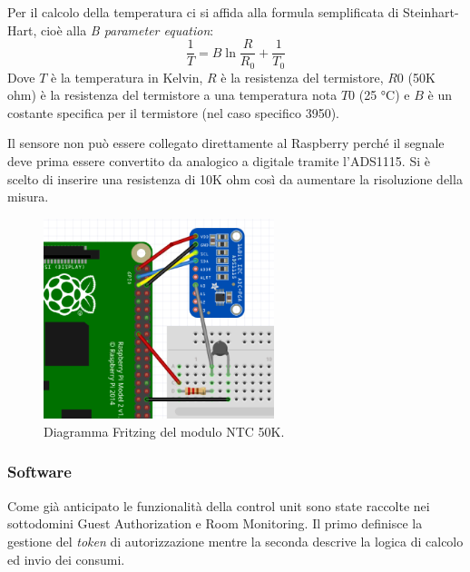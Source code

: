 Per il calcolo della temperatura ci si affida alla formula semplificata di Steinhart-Hart, cioè alla \textit{B parameter equation}:
%
\[\frac{1}{T} = B \ln{\frac{R}{R_0}} + \frac{1}{T_0}\]
%
Dove $T$ è la temperatura in Kelvin, $R$ è la resistenza del termistore, $R0$ (50K ohm) è la resistenza del termistore a una temperatura nota $T0$ (25 °C) e $B$ è un costante specifica per il termistore (nel caso specifico 3950). 

Il sensore non può essere collegato direttamente al Raspberry perché il segnale deve prima essere convertito da analogico a digitale tramite l'ADS1115. Si è scelto di inserire una resistenza di 10K ohm così da aumentare la risoluzione della misura.
\begin{figure}[H]
    \begin{center}
      \includegraphics[width=0.6\textwidth]{images/sensors/ntc-fritzing.png}
    \end{center}
    \caption{\label{ntc50k-diagram}Diagramma Fritzing del modulo NTC 50K.}
\end{figure}

\subsubsection{Software}
Come già anticipato le funzionalità della control unit sono state raccolte nei sottodomini Guest Authorization e Room Monitoring. Il primo definisce la gestione del \textit{token} di autorizzazione mentre la seconda descrive la logica di calcolo ed invio dei consumi.


